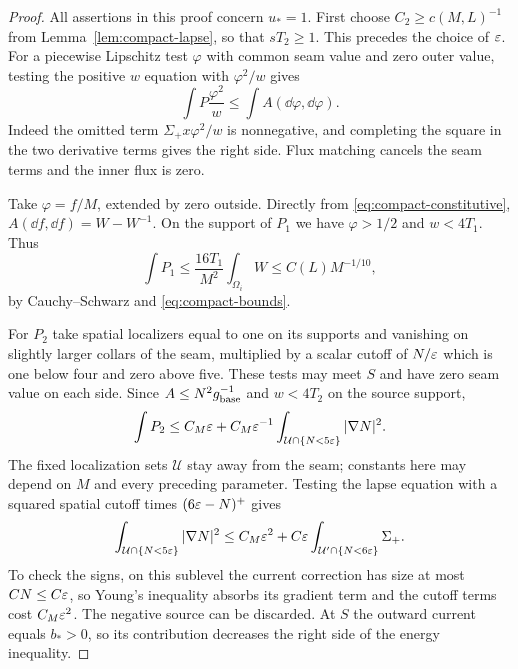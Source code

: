 \begin{proof}
All assertions in this proof concern $u_*=1$. First choose
$C_2\ge c(M,L)^{-1}$ from Lemma~\ref{lem:compact-lapse}, so that
$sT_2\ge1$. This precedes the choice of $\varepsilon$. For a piecewise
Lipschitz test $\varphi$ with common seam value and zero outer value,
testing the positive $w$ equation with $\varphi^2/w$ gives
\begin{equation}\label{eq:compact-penalty-test}
 \int P\frac{\varphi^2}{w}\le\int A(\dd\varphi,\dd\varphi).
\end{equation}
Indeed the omitted term $\Sigma_+x\varphi^2/w$ is nonnegative,
and completing the square in the two derivative terms gives the
right side. Flux matching cancels the seam terms and the inner flux
is zero.

Take $\varphi=f/M$, extended by zero outside. Directly from
\eqref{eq:compact-constitutive},
$A(\dd f,\dd f)=W-W^{-1}$. On the support of $P_1$ we have
$\varphi>1/2$ and $w<4T_1$. Thus
\[
 \int P_1\le\frac{16T_1}{M^2}\int_{\Omega_i}W
 \le C(L)M^{-1/10},
\]
by Cauchy--Schwarz and \eqref{eq:compact-bounds}.

For $P_2$ take spatial localizers equal to one on its supports and
vanishing on slightly larger collars of the seam, multiplied by a
scalar cutoff of $N/\varepsilon$ which is one below four and zero above five.
These tests may meet $S$ and have zero seam value on each side. Since
$A\le N^2g_{\rm base}^{-1}$ and $w<4T_2$ on the source support,
\begin{equation}\label{eq:compact-low-lapse-cost}
 \int P_2\le C_M\varepsilon+
 C_M\varepsilon^{-1}\int_{\mathcal U\cap\{N<5\varepsilon\}}|\nabla N|^2.
\end{equation}
The fixed localization sets $\mathcal U$ stay away from the seam;
constants here may depend on $M$ and every preceding parameter.
Testing the lapse equation with a squared spatial cutoff times
$(6\varepsilon-N)^+$ gives
\begin{equation}\label{eq:compact-low-lapse-energy}
 \int_{\mathcal U\cap\{N<5\varepsilon\}}|\nabla N|^2
 \le C_M\varepsilon^2+
 C\varepsilon\int_{\mathcal U'\cap\{N<6\varepsilon\}}\Sigma_+.
\end{equation}
To check the signs, on this sublevel the current correction has size
at most $CN\le C\varepsilon$, so Young's inequality absorbs its gradient
term and the cutoff terms cost $C_M\varepsilon^2$. The negative source can
be discarded. At $S$ the outward current equals $b_*>0$, so its
contribution decreases the right side of the energy inequality.


\end{proof}
